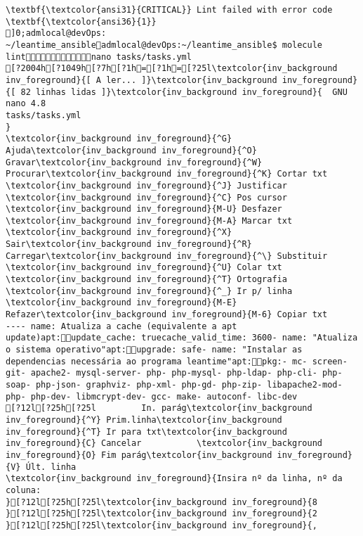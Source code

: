 \documentclass{scrartcl}
\begin{document}
\begin{Verbatim}
\textbf{\textcolor{ansi31}{CRITICAL}} Lint failed with error code \textbf{\textcolor{ansi36}{1}}
]0;admlocal@devOps: ~/leantime_ansibleadmlocal@devOps:~/leantime_ansible$ molecule lintnano tasks/tasks.yml 
[?2004h[?1049h[?7h[?1h=[?1h=[?25l\textcolor{inv_background inv_foreground}{[ A ler... ]}\textcolor{inv_background inv_foreground}{[ 82 linhas lidas ]}\textcolor{inv_background inv_foreground}{  GNU nano 4.8                                                tasks/tasks.yml                                                             }
\textcolor{inv_background inv_foreground}{^G} Ajuda\textcolor{inv_background inv_foreground}{^O} Gravar\textcolor{inv_background inv_foreground}{^W} Procurar\textcolor{inv_background inv_foreground}{^K} Cortar txt    \textcolor{inv_background inv_foreground}{^J} Justificar    \textcolor{inv_background inv_foreground}{^C} Pos cursor    \textcolor{inv_background inv_foreground}{M-U} Desfazer     \textcolor{inv_background inv_foreground}{M-A} Marcar txt
\textcolor{inv_background inv_foreground}{^X} Sair\textcolor{inv_background inv_foreground}{^R} Carregar\textcolor{inv_background inv_foreground}{^\} Substituir    \textcolor{inv_background inv_foreground}{^U} Colar txt     \textcolor{inv_background inv_foreground}{^T} Ortografia    \textcolor{inv_background inv_foreground}{^_} Ir p/ linha   \textcolor{inv_background inv_foreground}{M-E} Refazer\textcolor{inv_background inv_foreground}{M-6} Copiar txt
---- name: Atualiza a cache (equivalente a apt update)apt:update_cache: truecache_valid_time: 3600- name: "Atualiza o sistema operativo"apt:upgrade: safe- name: "Instalar as dependencias necessária ao programa leantime"apt:pkg:- mc- screen- git- apache2- mysql-server- php- php-mysql- php-ldap- php-cli- php-soap- php-json- graphviz- php-xml- php-gd- php-zip- libapache2-mod-php- php-dev- libmcrypt-dev- gcc- make- autoconf- libc-dev
[?12l[?25h[?25l         In. parág\textcolor{inv_background inv_foreground}{^Y} Prim.linha\textcolor{inv_background inv_foreground}{^T} Ir para txt\textcolor{inv_background inv_foreground}{C} Cancelar           \textcolor{inv_background inv_foreground}{O} Fim parág\textcolor{inv_background inv_foreground}{V} Últ. linha
\textcolor{inv_background inv_foreground}{Insira nº da linha, nº da coluna:                                                                                                         }[?12l[?25h[?25l\textcolor{inv_background inv_foreground}{8
}[?12l[?25h[?25l\textcolor{inv_background inv_foreground}{2
}[?12l[?25h[?25l\textcolor{inv_background inv_foreground}{,

\end{Verbatim}
\end{document}
